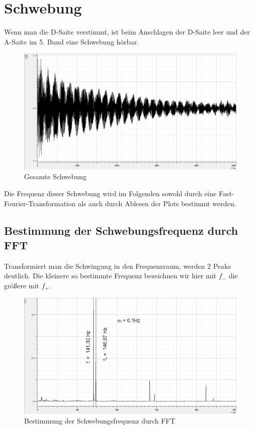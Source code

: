 \documentclass[12pt,a4paper]{article}
\author{Gruppe C14 \\ Julián Häck, Martin Koytek, Lars Wenning, Erik Zimmermann}
\begin{document}
\section{Schwebung}
Wenn man die D-Saite verstimmt, ist beim Anschlagen der D-Saite leer und der A-Saite im 5. Bund eine Schwebung hörbar.
\begin{figure}[H]
\centering
\includegraphics[scale=0.5]{schwebung/Schwebung_Roh.png}
\caption{Gesamte Schwebung}
\end{figure}

Die Frequenz dieser Schwebung wird im Folgenden sowohl durch eine Fast-Fourier-Transformation als auch durch Ablesen der Plots bestimmt werden.

\subsection{Bestimmung der Schwebungsfrequenz durch FFT}
Transformiert man die Schwingung in den Frequenzraum, werden 2 Peaks deutlich. Die kleinere so bestimmte Frequenz bezeichnen wir hier mit $f_-$ die größere mit $f_+$.
\begin{figure}[H]
\centering
\includegraphics[scale=0.5]{schwebung/Schwebung_FFT.png}
\caption{Bestimmung der Schwebungsfrequenz durch FFT}
\end{figure}
\end{document}
